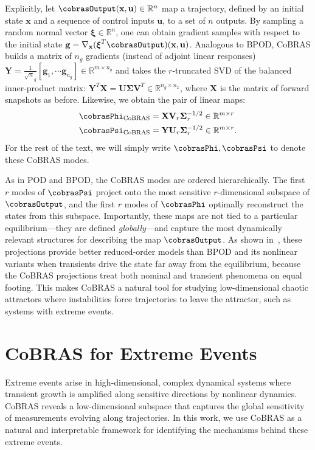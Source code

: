 \documentclass[twocolumn,10pt]{article}
\begin{document}
Explicitly, let $\cobrasOutput(\mathbf x, {\mathbf u}) \in \mathbb R^n$ map a trajectory, defined by an initial state $\mathbf x$ and a sequence of control inputs ${\mathbf u}$, to a set of $n$ outputs. By sampling a random normal vector  $\boldsymbol{\xi} \in \mathbb{R}^n$, one can obtain gradient samples with respect to the initial state $\mathbf g = \nabla_\mathbf{x} (\boldsymbol{\xi}^T \cobrasOutput)(\mathbf{x}, {\mathbf u})$. Analogous to BPOD, CoBRAS builds a matrix of $n_g$ gradients (instead of adjoint linear responses)  $\mathbf Y = \frac{1}{\sqrt n_g}[\mathbf g_1, \cdots \mathbf g_{n_g}] \in \mathbb{R}^{m \times n_g}$ and takes the $r$-truncated SVD of the balanced inner-product matrix: $\mathbf Y^T\mathbf X = \mathbf U \mathbf \Sigma \mathbf V^T  \in \mathbb{R}^{n_g \times n_x}$, where $\mathbf X$ is the matrix of forward snapshots as before. Likewise, we obtain the pair of linear maps:
%
\begin{align} \label{eq:cobras_modes}
    \cobrasPhi_{\text{CoBRAS}} 
        &= \mathbf{X} \mathbf V_r \mathbf{\Sigma}_r^{-1/2}
    \in \mathbb{R}^{m \times r}
    \\  
    \cobrasPsi_{\text{CoBRAS}} 
        &= \mathbf{Y} \mathbf U_r \mathbf{\Sigma}_r^{-1/2}
    \in \mathbb{R}^{m \times r}.
\end{align}
%
For the rest of the text, we will simply write $\cobrasPhi, \cobrasPsi$ to denote these CoBRAS modes. 

As in POD and BPOD, the CoBRAS modes are ordered hierarchically. The first $r$ modes of $\cobrasPsi$ project onto the most sensitive $r$-dimensional subspace of $\cobrasOutput$, and the first $r$ modes of $\cobrasPhi$ optimally reconstruct the states from this subspace. Importantly, these maps are not tied to a particular equilibrium---they are defined \textit{globally}---and capture the most dynamically relevant structures for describing the map $\cobrasOutput$. As shown in~\cite{otto2023model}, these projections provide better reduced-order models than BPOD and its nonlinear variants when transients drive the state far away from the equilibrium, because the CoBRAS projections treat both nominal and transient phenomena on equal footing. This makes CoBRAS a natural tool for studying low-dimensional chaotic attractors where instabilities force trajectories to leave the attractor, such as systems with extreme events.


\section{CoBRAS for Extreme Events}
\label{sec:methods_cobras}
Extreme events arise in high-dimensional, complex dynamical systems where transient growth is amplified along sensitive directions by nonlinear dynamics. CoBRAS reveals a low-dimensional subspace that captures the global sensitivity of measurements evolving along trajectories. In this work, we use CoBRAS as a natural and interpretable framework for identifying the mechanisms behind these extreme events. 
\end{document}
